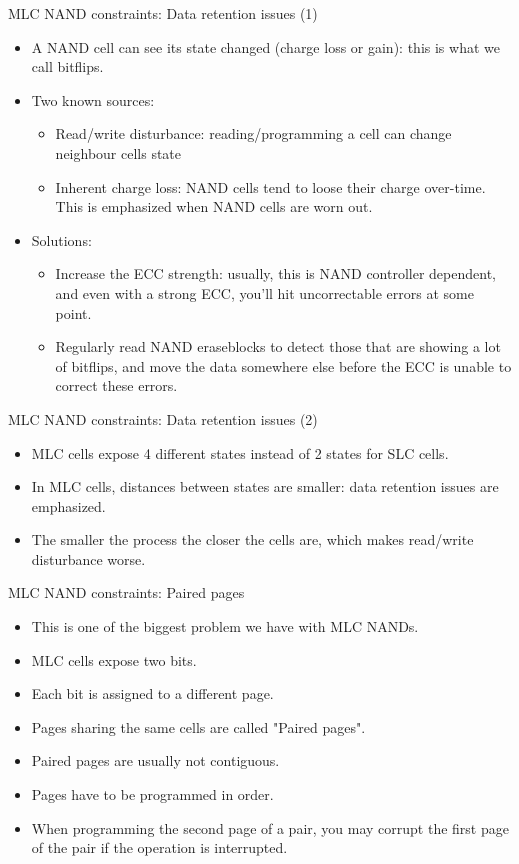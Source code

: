 \documentclass[aspectratio=169,obeyspaces,spaces,hyphens,dvipsnames]{beamer}
\begin{document}
\begin{frame}{MLC NAND constraints: Data retention issues (1)}
  \begin{itemize}
  \item A NAND cell can see its state changed (charge loss or gain):
	this is what we call bitflips.
  \item Two known sources:
    \begin{itemize}
    \item Read/write disturbance: reading/programming a cell can
	  change neighbour cells state
    \item Inherent charge loss: NAND cells tend to loose their
	  charge over-time. This is emphasized when NAND cells are
	  worn out.
    \end{itemize}
  \item Solutions:
    \begin{itemize}
    \item Increase the ECC strength: usually, this is NAND controller
	  dependent, and even with a strong ECC, you'll hit
	  uncorrectable errors at some point.
    \item Regularly read NAND eraseblocks to detect those that are
	  showing a lot of bitflips, and move the data somewhere else
	  before the ECC is unable to correct these errors.
    \end{itemize}
  \end{itemize}
\end{frame}

\begin{frame}{MLC NAND constraints: Data retention issues (2)}
  \begin{itemize}
  \item MLC cells expose 4 different states instead of 2 states for
	SLC cells.
  \item In MLC cells, distances between states are smaller: data
	retention issues are emphasized.
  \item The smaller the process the closer the cells are, which makes
	read/write disturbance worse.
  \end{itemize}
\end{frame}

\begin{frame}{MLC NAND constraints: Paired pages}
  \begin{itemize}
  \item This is one of the biggest problem we have with MLC NANDs.
  \item MLC cells expose two bits.
  \item Each bit is assigned to a different page.
  \item Pages sharing the same cells are called "Paired pages".
  \item Paired pages are usually not contiguous.
  \item Pages have to be programmed in order.
  \item When programming the second page of a pair, you may corrupt
	the first page of the pair if the operation is interrupted.
  \end{itemize}
\end{frame}
\end{document}
